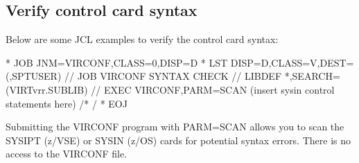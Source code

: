 \documentclass[letterpaper,10pt,english]{sphinxmanual}
\begin{document}
\subsection{Verify control card syntax}
\label{\detokenize{Installation_Guide:verify-control-card-syntax}}\label{\detokenize{Installation_Guide:index-159}}
\sphinxAtStartPar
Below are some JCL examples to verify the control card syntax:\sphinxhyphen{}

\begin{sphinxVerbatim}[commandchars=\\\{\}]
* \PYGZdl{}\PYGZdl{} JOB JNM=VIRCONF,CLASS=0,DISP=D
* \PYGZdl{}\PYGZdl{} LST DISP=D,CLASS=V,DEST=(,SPTUSER)
// JOB VIRCONF SYNTAX CHECK
// LIBDEF *,SEARCH=(VIRTvrr.SUBLIB)
// EXEC VIRCONF,PARM=\PYGZsq{}SCAN\PYGZsq{}
        (insert sysin control statements here)
/*
/\PYGZam{}
* \PYGZdl{}\PYGZdl{} EOJ
\end{sphinxVerbatim}

\sphinxAtStartPar
{}

\begin{sphinxVerbatim}[commandchars=\\\{\}]
  
   
  
  
  
  
            
\end{sphinxVerbatim}

\sphinxAtStartPar
{}

\sphinxAtStartPar
Submitting the VIRCONF program with PARM=SCAN allows you to scan the SYSIPT (z/VSE) or SYSIN (z/OS) cards for potential syntax errors. There is no access to the VIRCONF file.
\end{document}
